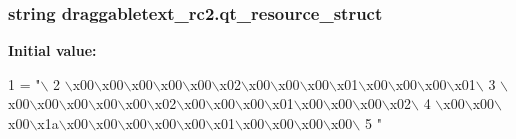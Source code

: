 \subsubsection[{qt\+\_\+resource\+\_\+struct}]{\setlength{\rightskip}{0pt plus 5cm}string draggabletext\+\_\+rc2.\+qt\+\_\+resource\+\_\+struct}\label{namespacedraggabletext__rc2_aac952306275d2818289e10669e0fa8ba}
{\bfseries Initial value\+:}
\begin{DoxyCode}
1 = \textcolor{stringliteral}{"\(\backslash\)}
2 \textcolor{stringliteral}{\(\backslash\)x00\(\backslash\)x00\(\backslash\)x00\(\backslash\)x00\(\backslash\)x00\(\backslash\)x02\(\backslash\)x00\(\backslash\)x00\(\backslash\)x00\(\backslash\)x01\(\backslash\)x00\(\backslash\)x00\(\backslash\)x00\(\backslash\)x01\(\backslash\)}
3 \textcolor{stringliteral}{\(\backslash\)x00\(\backslash\)x00\(\backslash\)x00\(\backslash\)x00\(\backslash\)x00\(\backslash\)x02\(\backslash\)x00\(\backslash\)x00\(\backslash\)x00\(\backslash\)x01\(\backslash\)x00\(\backslash\)x00\(\backslash\)x00\(\backslash\)x02\(\backslash\)}
4 \textcolor{stringliteral}{\(\backslash\)x00\(\backslash\)x00\(\backslash\)x00\(\backslash\)x1a\(\backslash\)x00\(\backslash\)x00\(\backslash\)x00\(\backslash\)x00\(\backslash\)x00\(\backslash\)x01\(\backslash\)x00\(\backslash\)x00\(\backslash\)x00\(\backslash\)x00\(\backslash\)}
5 \textcolor{stringliteral}{"}
\end{DoxyCode}
